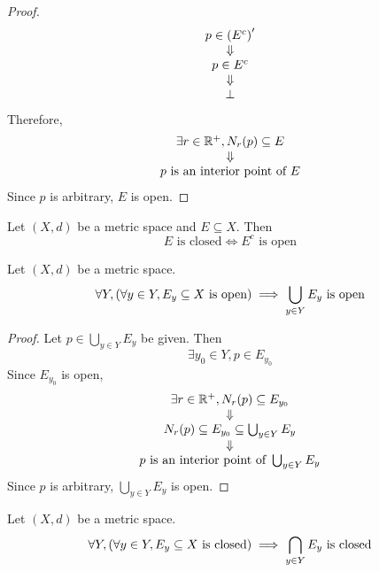 \begin{proof}
\[\begin{array}{c}
        p \in \paren*{E^{c}}' \\
        \Downarrow \\
        p \in E^{c} \\
        \Downarrow \\
        \bot
    \end{array}
    \]
    Therefore,
    \[
    \begin{array}{c}
        \exists r \in \R^{+}, N_{r}(p) \subseteq E \\
        \Downarrow \\
        p \text{ is an interior point of } E
    \end{array}
    \]
    Since $p$ is arbitrary, $E$ is open.
\end{proof}

\bigskip

\begin{corollary} \label{an:cor:closed-set-complement-is-open-set}
    Let $(X, d)$ be a metric space and $E \subseteq X$. Then
    \[
    E \text{ is closed} \iff E^{c} \text{ is open}
    \]
\end{corollary}

\bigskip

\begin{theorem} \label{an:thm:arbitrary-union-of-open-sets-is-open}
    Let $(X, d)$ be a metric space.
    \[
    \forall Y, \paren*{\forall y \in Y, E_{y} \subseteq X \text{ is open}} \implies \bigcup_{y \in Y} E_{y} \text{ is open}
    \]
\end{theorem}

\begin{proof}
    Let $p \in \bigcup_{y \in Y} E_{y}$ be given. Then
    \[
    \exists y_{0} \in Y, p \in E_{y_{0}}
    \]
    Since $E_{y_{0}}$ is open,
    \[
    \begin{array}{c}
        \exists r \in \R^{+}, N_{r}(p) \subseteq E_{y_{0}} \\
        \Downarrow \\
        N_{r}(p) \subseteq E_{y_{0}} \subseteq \bigcup_{y \in Y} E_{y} \\
        \Downarrow \\
        p \text{ is an interior point of } \bigcup_{y \in Y} E_{y}
    \end{array}
    \]
    Since $p$ is arbitrary, $\bigcup_{y \in Y} E_{y}$ is open.
\end{proof}

\bigskip

\begin{corollary} \label{an:cor:arbitrary-intersection-of-closed-sets-is-closed}
    Let $(X, d)$ be a metric space.
    \[
    \forall Y, \paren*{\forall y \in Y, E_{y} \subseteq X \text{ is closed}} \implies \bigcap_{y \in Y} E_{y} \text{ is closed}
    \]
\end{corollary}

